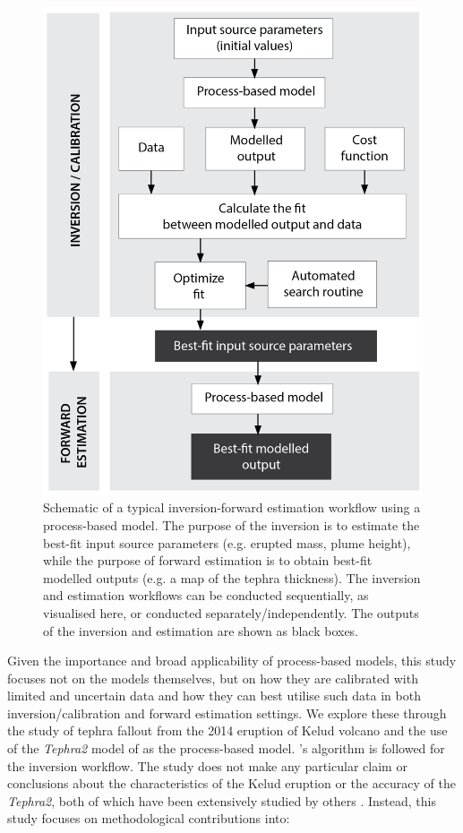 \documentclass[a4paper,fleqn]{cas-sc}
\begin{document}
\begin{figure}[htbp]
\centering
\includegraphics[width=.6\linewidth]{Figures/fig1_schematic.png}
\caption{Schematic of a typical inversion-forward estimation workflow using a process-based model. The purpose of the inversion is to estimate the best-fit input source parameters (e.g. erupted mass, plume height), while the purpose of forward estimation is to obtain best-fit modelled outputs (e.g. a map of the tephra thickness). The inversion and estimation workflows can be conducted sequentially, as visualised here, or conducted separately/independently. The outputs of the inversion and estimation are shown as black boxes.}
\label{fig:schem-typ}
\end{figure}

Given the importance and broad applicability of process-based models, this study focuses not on the models themselves, but on how they are calibrated with limited and uncertain data and how they can best utilise such data in both inversion/calibration and forward estimation settings. We explore these through the study of tephra fallout from the 2014 eruption of Kelud volcano and the use of the \textit{Tephra2} model of \cite{bonadonna2005probabilistic} as the process-based model. \cite{connor2006inversion}'s algorithm is followed for the inversion workflow. The study does not make any particular claim or conclusions about the characteristics of the Kelud eruption or the accuracy of the \textit{Tephra2}, both of which have been extensively studied by others \citep{MAENO201924,caudron2015,HARGIE201981, SUZUKI201942, connor2011tephra2, connor2006inversion}. Instead, this study focuses on methodological contributions into:
\end{document}

